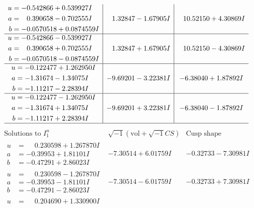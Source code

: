 \documentclass[1p]{elsarticle_modified}
\theoremstyle{definition}
\newcommand{\I}{\sqrt{-1}}
\begin{document}
$$\begin{array}{c|c|c}
\begin{aligned}
u &= -0.542866 + 0.539927 I \\
a &= \phantom{-}0.390658 - 0.702555 I \\
b &= -0.0570518 + 0.0874559 I\end{aligned}
 & \phantom{-}1.32847 - 1.67905 I & \phantom{-}10.52150 + 4.30869 I \\ \hline\begin{aligned}
u &= -0.542866 - 0.539927 I \\
a &= \phantom{-}0.390658 + 0.702555 I \\
b &= -0.0570518 - 0.0874559 I\end{aligned}
 & \phantom{-}1.32847 + 1.67905 I & \phantom{-}10.52150 - 4.30869 I \\ \hline\begin{aligned}
u &= -0.122477 + 1.262950 I \\
a &= -1.31674 - 1.34075 I \\
b &= -1.11217 - 2.28394 I\end{aligned}
 & -9.69201 - 3.22381 I & -6.38040 + 1.87892 I \\ \hline\begin{aligned}
u &= -0.122477 - 1.262950 I \\
a &= -1.31674 + 1.34075 I \\
b &= -1.11217 + 2.28394 I\end{aligned}
 & -9.69201 + 3.22381 I & -6.38040 - 1.87892 I\\
 \hline 
 \end{array}$$\newpage$$\begin{array}{c|c|c}  
\text{Solutions to }I^u_{1}& \I (\text{vol} + \sqrt{-1}CS) & \text{Cusp shape}\\
 \hline 
\begin{aligned}
u &= \phantom{-}0.230598 + 1.267870 I \\
a &= -0.39953 + 1.81101 I \\
b &= -0.47291 + 2.86023 I\end{aligned}
 & -7.30514 + 6.01759 I & -0.32733 - 7.30981 I \\ \hline\begin{aligned}
u &= \phantom{-}0.230598 - 1.267870 I \\
a &= -0.39953 - 1.81101 I \\
b &= -0.47291 - 2.86023 I\end{aligned}
 & -7.30514 - 6.01759 I & -0.32733 + 7.30981 I \\ \hline\begin{aligned}
u &= \phantom{-}0.204690 + 1.330900 I \\

\end{aligned}
\end{array}$$
\end{document}
